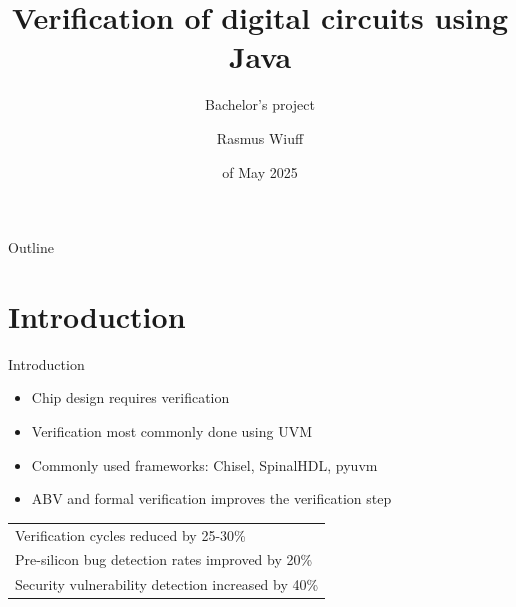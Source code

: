 \documentclass[aspectratio=169, handout]{beamer}
\title{Verification of digital circuits using Java}
\subtitle{Bachelor's project}
\author{Rasmus Wiuff}
\institute{DTU}
\date{\nth{19} of May 2025}
\begin{document}
\frame[plain]{\titlepage}

\begin{frame}{Outline}
    \tableofcontents
\end{frame}

\section{Introduction}
\begin{frame}{Introduction}
    \begin{itemize}
        \item Chip design requires verification
        \item Verification most commonly done using UVM
        \item Commonly used frameworks: Chisel, SpinalHDL, pyuvm
        \item ABV and formal verification improves the verification step
    \end{itemize}
    \begin{center}
        \begin{tabular}{l}
            \toprule
            Verification cycles reduced by 25-30\%             \\
            Pre-silicon bug detection rates improved by 20\%   \\
            Security vulnerability detection increased by 40\% \\
            \bottomrule
        \end{tabular}
    \end{center}
\end{frame}
\end{document}
